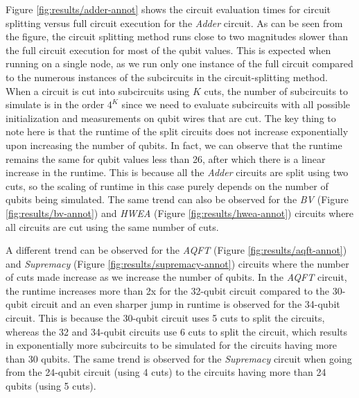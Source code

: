 %
%
\vspace{\baselineskip}
Figure \ref{fig:results/adder-annot} shows the circuit evaluation times for circuit splitting versus full circuit execution for the \textit{Adder} circuit. As can be seen from the figure, the circuit splitting method runs close to two magnitudes slower than the full circuit execution for most of the qubit values. This is expected when running on a single node, as we run only one instance of the full circuit compared to the numerous instances of the subcircuits in the circuit-splitting method. When a circuit is cut into subcircuits using $K$ cuts, the number of subcircuits to simulate is in the order $4^K$ since we need to evaluate subcircuits with all possible initialization and measurements on qubit wires that are cut. The key thing to note here is that the runtime of the split circuits does not increase exponentially upon increasing the number of qubits. In fact, we can observe that the runtime remains the same for qubit values less than 26, after which there is a linear increase in the runtime. This is because all the \textit{Adder} circuits are split using two cuts, so the scaling of runtime in this case purely depends on the number of qubits being simulated. The same trend can also be observed for the \textit{BV} (Figure \ref{fig:results/bv-annot}) and \textit{HWEA} (Figure \ref{fig:results/hwea-annot}) circuits where all circuits are cut using the same number of cuts.  

A different trend can be observed for the \textit{AQFT} (Figure \ref{fig:results/aqft-annot}) and \textit{Supremacy} (Figure \ref{fig:results/supremacy-annot}) circuits where the number of cuts made increase as we increase the number of qubits. In the \textit{AQFT} circuit, the runtime increases more than 2x for the 32-qubit circuit compared to the 30-qubit circuit and an even sharper jump in runtime is observed for the 34-qubit circuit. This is because the 30-qubit circuit uses 5 cuts to split the circuits, whereas the 32 and 34-qubit circuits use 6 cuts to split the circuit, which results in exponentially more subcircuits to be simulated for the circuits having more than 30 qubits. The same trend is observed for the \textit{Supremacy} circuit when going from the 24-qubit circuit (using 4 cuts) to the circuits having more than 24 qubits (using 5 cuts).



